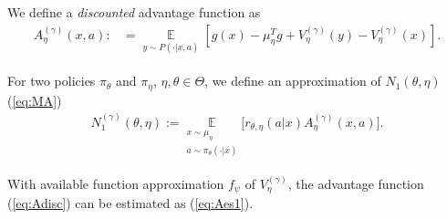 \documentclass[11pt]{article}
\newcommand{\R}{\mathbb{R}}
\newcommand{\E}{\mathbb{E}}
\newcommand{\X}{\mathcal{X}}
\theoremstyle{definition}
\numberwithin{equation}{section}
\begin{document}

We define a \textit{discounted} advantage function as
\begin{align}\label{eq:Adisc}
A^{(\gamma)}_{\eta}(x, a):& = \underset{\substack{ y\sim P(\cdot|x, a)}  }{\E} \left[g(x) - \mu_\eta^T g + V_{\eta}^{(\gamma)}(y) -V_{\eta}^{(\gamma)} (x)\right].
\end{align}

For two policies $\pi_\theta$ and  $\pi_\eta$, $\eta, \theta \in \Theta$, we define an approximation of $N_1(\theta, \eta)$ (\ref{eq:MA})
\begin{align}\label{eq:Ndisc}
N_1^{(\gamma)}(\theta, \eta):=   \underset{\substack{ x\sim \mu_{\eta} \\ a\sim \pi_{\theta}(\cdot|x)  }  }{\E}  \Big[ r_{\theta, \eta}(a|x) A^{(\gamma)}_{\eta} (x, a)\Big].
\end{align}

With available function approximation $f_\psi$ of $V_{\eta}^{(\gamma)}$, the advantage function (\ref{eq:Adisc}) can be estimated as (\ref{eq:Aes1}).





\end{document}
